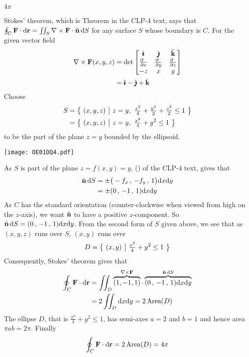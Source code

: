 %

\begin{answer} 
$4\pi$
\end{answer}

\begin{solution}
Stokes' theorem, which is Theorem 
in the CLP-4 text, says that $\oint_C\mathbf{F}\cdot \mathrm{d}\mathbf{r}
=\iint_S\nabla\times\mathbf{F}\cdot\hat{\mathbf{n}}\,\mathrm{d}S$ for any surface $S$ whose boundary is
$C$. For the given vector field
\begin{align*}
\nabla\times\vF(x,y,z)
&=\det\left[\begin{matrix}
\hi &\hj &\hk \\
\tfrac{\partial\hfill}{\partial x} & \tfrac{\partial\hfill}{\partial y} & 
                \tfrac{\partial\hfill}{\partial z} \\
-z & x & y
\end{matrix}
\right] \\
&=\hi-\hj+\hk
\end{align*}
Choose 
\begin{align*}
S &= \big\{ \ (x,y,z)\ \big|\ z=y,\ \tfrac{x^2}{4}+\tfrac{y^2}{2}+\tfrac{z^2}{2}\le 1\ \big\} \\
  &= \big\{ \ (x,y,z)\ \big|\ z=y,\ \tfrac{x^2}{4}+y^2\le 1\ \big\}
\end{align*}
to be the part of the plane $z=y$ bounded by the ellipsoid.

\begin{center}
   \texttt{[image: OE01DQ4.pdf]}
\end{center}

As $S$ is part of the plane $z=f(x,y)=y$, ()
of the CLP-4 text, gives that
\begin{align*}
\hat{\mathbf{n}}\,\mathrm{d}S &=\pm \big(-f_x\,,\,-f_y\,,\, 1\big)\mathrm{d}x\mathrm{d}y \\
&=\pm (0\,,\,-1\,,\, 1)\mathrm{d}x\mathrm{d}y 
\end{align*}
As $C$ has the standard orientation (counter-clockwise when viewed 
from high on the $z$-axis), we want $\hat{\mathbf{n}}$ to have a positive $z$-component. 
So 
$\hat{\mathbf{n}}\,\mathrm{d}S= (0\,,\,-1\,,\, 1)\mathrm{d}x\mathrm{d}y $.
From the second form of $S$ given above, we see that as $(x,y,z)$
runs over $S$, $(x,y)$ runs over
\begin{equation*}
D=\big\{ \ (x,y)\ \big|\ \tfrac{x^2}{4}+y^2\le 1\ \big\}
\end{equation*}
Consequently, Stokes' theorem gives that
\begin{align*}
\oint_C\mathbf{F}\cdot \mathrm{d}\mathbf{r}
&=\iint_D\overbrace{(1,-1,1)}^{\nabla\times\mathbf{F}}\cdot
            \overbrace{(0\,,\,-1\,,\, 1)\mathrm{d}x\mathrm{d}y }^{\hat{\mathbf{n}}\,\mathrm{d}S} \\
&=2\iint_D \mathrm{d}x\mathrm{d}y
=2\,\text{Area}(D)
\end{align*}
The ellipse $D$, that is $\tfrac{x^2}{4}+y^2\le 1$, has semi-axes
$a=2$ and $b=1$ and hence area $\pi ab=2\pi$. Finally
\begin{equation*}
\oint_C\mathbf{F}\cdot \mathrm{d}\mathbf{r}
=2\,\text{Area}(D)
=4\pi
\end{equation*}
\end{solution}


